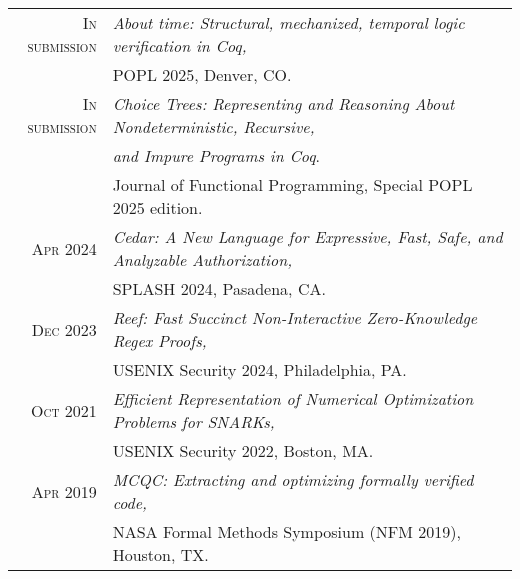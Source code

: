 \begin{tabular}{rl}
\textsc{In submission}& \emph{About time: Structural, mechanized, temporal logic verification in Coq,}\\
                      & POPL 2025, Denver, CO.  \\[0.5em]
\textsc{In submission}& \emph{Choice Trees: Representing and Reasoning About Nondeterministic, Recursive,} \\
                      & \emph{and Impure Programs in Coq}. \\
                      & Journal of Functional Programming, Special POPL 2025 edition.  \\[0.5em]
\textsc{Apr} 2024 & \emph{Cedar: A New Language for Expressive, Fast, Safe, and Analyzable Authorization,} \\
                  & SPLASH 2024, Pasadena, CA.  \\[0.5em]
\textsc{Dec} 2023 & \emph{Reef: Fast Succinct Non-Interactive Zero-Knowledge Regex Proofs,} \\
                  & USENIX Security 2024, Philadelphia, PA.  \\[0.5em]
\textsc{Oct} 2021 & \emph{Efficient Representation of Numerical Optimization Problems for SNARKs,} \\
                  & USENIX Security 2022, Boston, MA.  \\[0.5em]
\textsc{Apr} 2019 & \emph{MCQC: Extracting and optimizing formally verified code,} \\
                  & NASA Formal Methods Symposium (NFM 2019), Houston, TX. \\
\end{tabular}
